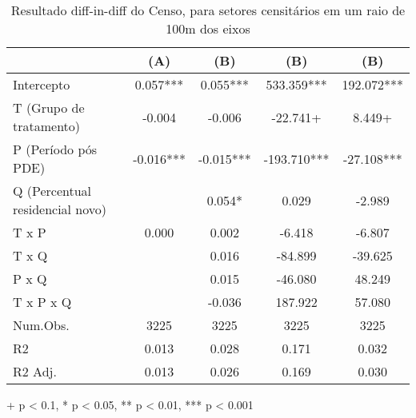 \begin{table}[!t]
\caption{Resultado diff-in-diff do Censo, para setores censitários em um raio de 100m dos eixos} 
\fontsize{12.0pt}{14.4pt}\selectfont
\begin{tabular*}{\linewidth}{@{\extracolsep{\fill}}lcccc}
\toprule
  & (A) & (B) & (B)  & (B)   \\ 
\midrule\addlinespace[2.5pt]
Intercepto & 0.057*** & 0.055*** & 533.359*** & 192.072*** \\ 
T (Grupo de tratamento) & -0.004 & -0.006 & -22.741+ & 8.449+ \\ 
P (Período pós PDE) & -0.016*** & -0.015*** & -193.710*** & -27.108*** \\ 
Q (Percentual residencial novo) &  & 0.054* & 0.029 & -2.989 \\ 
T x P & 0.000 & 0.002 & -6.418 & -6.807 \\ 
T x Q &  & 0.016 & -84.899 & -39.625 \\ 
P x Q &  & 0.015 & -46.080 & 48.249 \\ 
{T x P x Q} & {} & {-0.036} & {187.922} & {57.080} \\ 
Num.Obs. & 3225 & 3225 & 3225 & 3225 \\ 
R2 & 0.013 & 0.028 & 0.171 & 0.032 \\ 
R2 Adj. & 0.013 & 0.026 & 0.169 & 0.030 \\ 
\bottomrule
\end{tabular*}
\begin{minipage}{\linewidth}
+ p < 0.1, * p < 0.05, ** p < 0.01, *** p < 0.001\\
\end{minipage}
\end{table}

